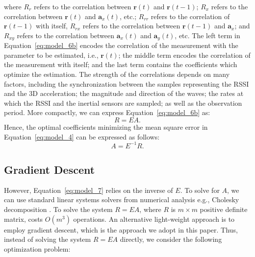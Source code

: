 where $R_{r}$ refers to the correlation between $\mathbf{r}(t)$ and $\mathbf{r}(t-1)$; $R_{x}$ refers to the correlation between $\mathbf{r}(t)$ and $\mathbf{a}_x(t)$, etc.; $R_{rr}$ refers to the correlation of $\mathbf{r} (t-1) $ with itself, $R_{rx}$ refers to the correlation between $\mathbf{r}(t-1)$ and $\mathbf{a}_x$; and $R_{xy}$ refers to the correlation between $\mathbf{a}_x(t)$ and $\mathbf{a}_y(t)$, etc. The left term in Equation~\ref{eq:model_6b} encodes the correlation of the measurement with the parameter to be estimated, i.e., $\mathbf{r}(t)$; the middle term encodes the correlation of the measurement with itself; and the last term contains the coefficients which optimize the estimation. The strength of the correlations depends on many factors, including the synchronization between the samples representing the RSSI and the 3D acceleration; the magnitude and direction of the waves; the rates at which the RSSI and the inertial sensors are sampled; as well as the observation period. More compactly, we can express Equation~\ref{eq:model_6b} as:
\begin{equation}
    \label{eq:model_6}
     R =   E   A.
\end{equation}
Hence, the optimal coefficients minimizing the mean square error in Equation~\ref{eq:model_4} can be expressed as follows:
\begin{equation}
\label{eq:model_7}
 A = E^{-1} R.
 \end{equation}

\subsection{Gradient Descent}
However, Equation~\ref{eq:model_7} relies on the inverse of $E$. To solve for $A$, we can use standard linear systems solvers from numerical analysis e.g., Cholesky decomposition \cite{trefethen2022numerical}. To solve the system $R=EA$, where $R$ is $m\times m$ positive definite matrix, costs $O(m^3)$ operations. An alternative light-weight approach is to employ gradient descent, which is the approach we adopt in this paper. Thus, instead of solving the system $R=EA$ directly, we consider the following optimization problem:

